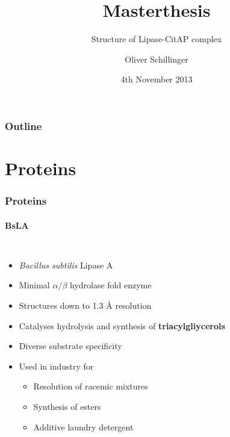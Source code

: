 \documentclass[english]{beamer}
\title[Masterthesis]{Masterthesis}
\subtitle[Structure]{Structure of Lipase-CitAP complex}
\author{Oliver Schillinger}
\institute{ICS-6 | Multiscale Modelling Group}
\date{4th November 2013}
\begin{document}
\maketitle

\begin{frame}
    \frametitle{Outline}
    \tableofcontents
\end{frame}


\section{Proteins}

\begin{frame}
    \frametitle{Proteins}
    \framesubtitle{BsLA}

    \begin{columns}[t]
        \begin{itemize}
            \item \textit{Bacillus subtilis} Lipase A
            \item Minimal $\alpha/\beta$ hydrolase fold enzyme
            \item Structures down to 1.3 \r{A} resolution
            \item Catalyses hydrolysis and synthesis of \textbf{triacylgliycerols}
            \item Diverse substrate specificity
            \item Used in industry for
                \begin{itemize}
                    \item Resolution of racemic mixtures
                    \item Synthesis of esters
                    \item Additive laundry detergent
                \end{itemize}
        \end{itemize} 


\end{columns}
\end{frame}
\end{document}
